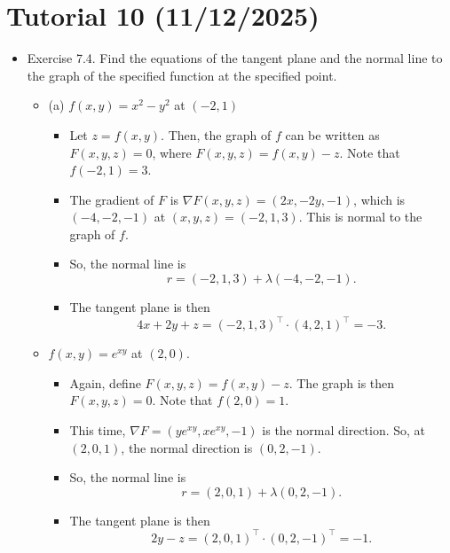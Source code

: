 \documentclass{article}
\begin{document}
\section{Tutorial 10 (11/12/2025)}
\begin{itemize}
    \item Exercise 7.4. Find the equations of the tangent plane and the normal line to the graph of the specified function at the specified point.
    \begin{itemize}
        \item (a) $f(x,y) = x^2-y^2$ at $(-2,1)$
        \begin{itemize}
            \item Let $z=f(x,y)$. Then, the graph of $f$ can be written as $F(x,y,z)=0$, where $F(x,y,z) = f(x,y)-z$. Note that $f(-2,1)=3$.
            \item The gradient of $F$ is $\nabla F(x,y,z) = (2x,-2y,-1)$, which is $(-4,-2,-1)$ at $(x,y,z)=(-2,1,3)$. This is normal to the graph of $f$.
            \item So, the normal line is
            \[
            r = (-2,1,3) + \lambda(-4,-2,-1).
            \]
            \item The tangent plane is then
            \[
            4x+2y+z = (-2,1,3)^\top \cdot (4,2,1)^\top = -3.
            \]
        \end{itemize}
        \item $f(x,y)=e^{xy}$ at $(2,0)$.
        \begin{itemize}
            \item Again, define $F(x,y,z) = f(x,y) - z$. The graph is then $F(x,y,z)=0$. Note that $f(2,0)=1$.
            \item This time, $\nabla F = (ye^{xy},xe^{xy},-1)$ is the normal direction. So, at $(2,0,1)$, the normal direction is $(0,2,-1)$.
            \item So, the normal line is
            \[
            r = (2,0,1) + \lambda(0,2,-1).
            \]
            \item The tangent plane is then
            \[
            2y-z = (2,0,1)^\top \cdot (0,2,-1)^\top = -1.
            \]
        \end{itemize}
    \end{itemize}
\end{itemize}
\end{document}
